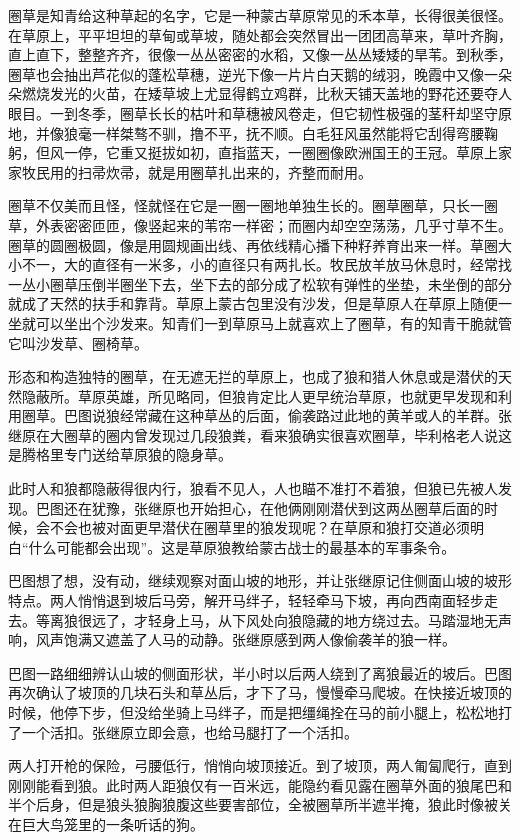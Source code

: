 \par 圈草是知青给这种草起的名字，它是一种蒙古草原常见的禾本草，长得很美很怪。在草原上，平平坦坦的草甸或草坡，随处都会突然冒出一团团高草来，草叶齐胸，直上直下，整整齐齐，很像一丛丛密密的水稻，又像一丛丛矮矮的旱苇。到秋季，圈草也会抽出芦花似的蓬松草穗，逆光下像一片片白天鹅的绒羽，晚霞中又像一朵朵燃烧发光的火苗，在矮草坡上尤显得鹤立鸡群，比秋天铺天盖地的野花还要夺人眼目。一到冬季，圈草长长的枯叶和草穗被风卷走，但它韧性极强的茎秆却坚守原地，并像狼毫一样桀骜不驯，撸不平，抚不顺。白毛狂风虽然能将它刮得弯腰鞠躬，但风一停，它重又挺拔如初，直指蓝天，一圈圈像欧洲国王的王冠。草原上家家牧民用的扫帚炊帚，就是用圈草扎出来的，齐整而耐用。
\par 圈草不仅美而且怪，怪就怪在它是一圈一圈地单独生长的。圈草圈草，只长一圈草，外表密密匝匝，像竖起来的苇帘一样密；而圈内却空空荡荡，几乎寸草不生。圈草的圆圈极圆，像是用圆规画出线、再依线精心播下种籽养育出来一样。草圈大小不一，大的直径有一米多，小的直径只有两扎长。牧民放羊放马休息时，经常找一丛小圈草压倒半圈坐下去，坐下去的部分成了松软有弹性的坐垫，未坐倒的部分就成了天然的扶手和靠背。草原上蒙古包里没有沙发，但是草原人在草原上随便一坐就可以坐出个沙发来。知青们一到草原马上就喜欢上了圈草，有的知青干脆就管它叫沙发草、圈椅草。
\par 形态和构造独特的圈草，在无遮无拦的草原上，也成了狼和猎人休息或是潜伏的天然隐蔽所。草原英雄，所见略同，但狼肯定比人更早统治草原，也就更早发现和利用圈草。巴图说狼经常藏在这种草丛的后面，偷袭路过此地的黄羊或人的羊群。张继原在大圈草的圈内曾发现过几段狼粪，看来狼确实很喜欢圈草，毕利格老人说这是腾格里专门送给草原狼的隐身草。
\par 此时人和狼都隐蔽得很内行，狼看不见人，人也瞄不准打不着狼，但狼已先被人发现。巴图还在犹豫，张继原也开始担心，在他俩刚刚潜伏到这两丛圈草后面的时候，会不会也被对面更早潜伏在圈草里的狼发现呢？在草原和狼打交道必须明白“什么可能都会出现”。这是草原狼教给蒙古战士的最基本的军事条令。
\par 巴图想了想，没有动，继续观察对面山坡的地形，并让张继原记住侧面山坡的坡形特点。两人悄悄退到坡后马旁，解开马绊子，轻轻牵马下坡，再向西南面轻步走去。等离狼很远了，才轻身上马，从下风处向狼隐藏的地方绕过去。马踏湿地无声响，风声饱满又遮盖了人马的动静。张继原感到两人像偷袭羊的狼一样。
\par 巴图一路细细辨认山坡的侧面形状，半小时以后两人绕到了离狼最近的坡后。巴图再次确认了坡顶的几块石头和草丛后，才下了马，慢慢牵马爬坡。在快接近坡顶的时候，他停下步，但没给坐骑上马绊子，而是把缰绳拴在马的前小腿上，松松地打了一个活扣。张继原立即会意，也给马腿打了一个活扣。
\par 两人打开枪的保险，弓腰低行，悄悄向坡顶接近。到了坡顶，两人匍匐爬行，直到刚刚能看到狼。此时两人距狼仅有一百米远，能隐约看见露在圈草外面的狼尾巴和半个后身，但是狼头狼胸狼腹这些要害部位，全被圈草所半遮半掩，狼此时像被关在巨大鸟笼里的一条听话的狗。
